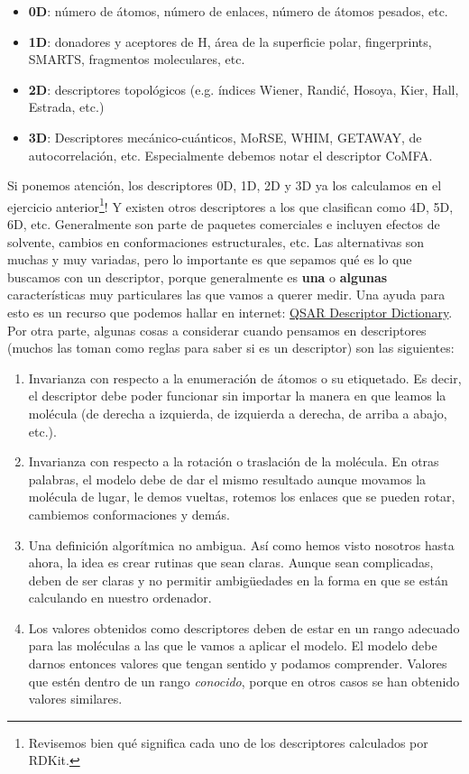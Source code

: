 \documentclass[10pt,letterpaper]{article}
\begin{document}
\begin{itemize}
\item \textbf{0D}: n\'umero de \'atomos, n\'umero de enlaces, n\'umero de \'atomos pesados, etc.
\item \textbf{1D}: donadores y aceptores de H, \'area de la superficie polar, fingerprints, SMARTS, fragmentos moleculares, etc.
\item \textbf{2D}: descriptores topol\'ogicos (e.g. \'indices Wiener, Randi\'c, Hosoya, Kier, Hall, Estrada, etc.)
\item \textbf{3D}: Descriptores mec\'anico-cu\'anticos, MoRSE, WHIM, GETAWAY, de autocorrelaci\'on, etc. Especialmente debemos notar el descriptor CoMFA.
\end{itemize}

Si ponemos atenci\'on, los descriptores 0D, 1D, 2D y 3D ya los calculamos en el ejercicio anterior\footnote{Revisemos bien qu\'e significa cada uno de los descriptores calculados por RDKit.}! Y existen otros descriptores a los que clasifican como 4D, 5D, 6D, etc. Generalmente son parte de paquetes comerciales e incluyen efectos de solvente, cambios en conformaciones estructurales, etc. Las alternativas son muchas y muy variadas, pero lo importante es que sepamos qu\'e es lo que buscamos con un descriptor, porque generalmente es \textbf{una} o \textbf{algunas} caracter\'isticas muy particulares las que vamos a querer medir. Una ayuda para esto es un recurso que podemos hallar en internet: \href{http://qsar.sourceforge.net/dicts/qsar-descriptors/index.xhtml}{QSAR Descriptor Dictionary}. Por otra parte, algunas cosas a considerar cuando pensamos en descriptores (muchos las toman como reglas para saber si es un descriptor) son las siguientes:

\begin{enumerate}
\item Invarianza con respecto a la enumeraci\'on de \'atomos o su etiquetado. Es decir, el descriptor debe poder funcionar sin importar la manera en que leamos la mol\'ecula (de derecha a izquierda, de izquierda a derecha, de arriba a abajo, etc.).
\item Invarianza con respecto a la rotaci\'on o traslaci\'on de la mol\'ecula. En otras palabras, el modelo debe de dar el mismo resultado aunque movamos la mol\'ecula de lugar, le demos vueltas, rotemos los enlaces que se pueden rotar, cambiemos conformaciones y dem\'as.
\item Una definici\'on algor\'itmica no ambigua. As\'i como hemos visto nosotros hasta ahora, la idea es crear rutinas que sean claras. Aunque sean complicadas, deben de ser claras y no permitir ambig\"uedades en la forma en que se est\'an calculando en nuestro ordenador.
\item Los valores obtenidos como descriptores deben de estar en un rango adecuado para las mol\'eculas a las que le vamos a aplicar el modelo. El modelo debe darnos entonces valores que tengan sentido y podamos comprender. Valores que est\'en dentro de un rango \emph{conocido}, porque en otros casos se han obtenido valores similares.
\end{enumerate}
\end{document}
